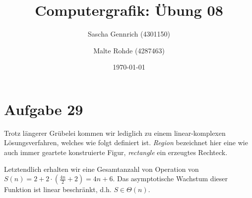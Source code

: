 \documentclass[a4paper]{scrartcl}
\title{Computergrafik: Übung 08}
\author{Sascha Gennrich (4301150) \and Malte Rohde (4287463)}
\date{\today{}}
\begin{document}
\maketitle

\section*{Aufgabe 29}
Trotz längerer Grübelei kommen wir lediglich zu einem linear-komplexen Lösungsverfahren, welches wie folgt definiert ist. \emph{Region} bezeichnet hier eine wie auch immer geartete konstruierte Figur, \emph{rectangle} ein erzeugtes Rechteck.
\begin{algorithmic}
 
 
 
 
 
  
 
\ENDFOR
{} 
 
\end{algorithmic}
Letztendlich erhalten wir eine Gesamtanzahl von Operation von $S(n) = 2 + 2 \cdot \left(\frac{4n}{2} + 2\right) = 4n + 6$. Das asymptotische Wachstum dieser Funktion ist linear beschränkt, d.h. $S \in \Theta(n)$.
\end{document}
